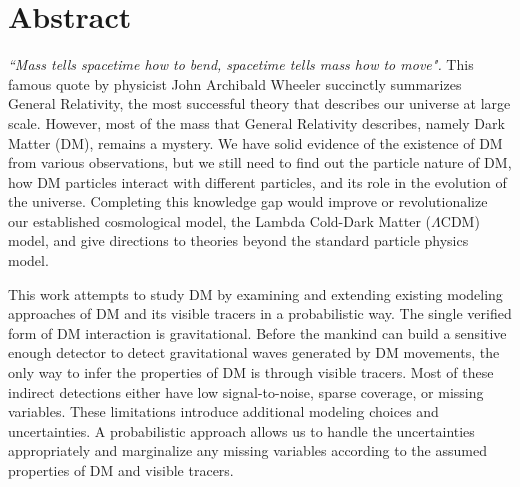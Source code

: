 \documentclass[ucdthesis.tex]{subfiles}
\begin{document}

    \doublespacing
		\section*{Abstract} 

		{\it ``Mass tells spacetime how to bend, spacetime tells mass how to move".}
		This famous quote by physicist John Archibald Wheeler succinctly summarizes General
		Relativity,  the most successful theory that describes our universe
		at large scale. However, most of the mass that General Relativity describes,
		namely Dark Matter (DM), remains a mystery.  
		We have solid evidence of the existence of DM from various
		observations, but we still need to find out the particle nature of DM,  
		how DM particles interact with different particles, and its role in the
		evolution of the universe. Completing this knowledge gap would improve or 
		revolutionalize our established cosmological model,
		the Lambda Cold-Dark Matter	($\Lambda$CDM) model, 
		and give directions to theories beyond the standard particle
		physics model. 

			This work attempts to study DM by examining and
		extending existing modeling approaches of DM and its visible tracers in a
		probabilistic way. The single verified form of 
		DM interaction is gravitational. Before the mankind can build a sensitive 
		enough detector to detect gravitational waves generated by DM movements, the 
		only way to infer the properties of DM is through visible tracers. Most of 
		these indirect detections	either have low signal-to-noise, sparse coverage, 
		or missing
		variables. These limitations introduce additional
		modeling choices and uncertainties. A probabilistic approach allows us to
		handle the uncertainties appropriately and marginalize any 
		missing variables 
		according to the assumed properties of DM and visible tracers. 	
		
\end{document}
